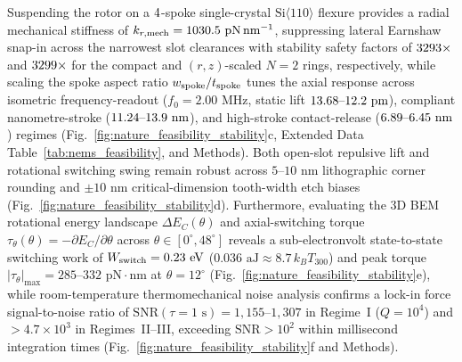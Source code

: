 \documentclass[pdflatex,sn-nature]{sn-jnl}
\DeclareRobustCommand{\roundzero}[1]{\fpeval{round(#1,0)}}
\DeclareRobustCommand{\roundone}[1]{\fpeval{round(#1,1)}}
\DeclareRobustCommand{\roundtwo}[1]{\fpeval{round(#1,2)}}
\begin{document}
Suspending the rotor on a $4{}$-spoke single-crystal $\text{Si}\langle 110\rangle$ flexure provides a radial mechanical stiffness of $k_{r,\rm mech} = \roundone{\NatureRotCeightCompactNtwoLateralStabilityKRMechPnPerNm}\text{ pN}\,\text{nm}^{-1}$, suppressing lateral Earnshaw snap-in across the narrowest slot clearances with stability safety factors of $\roundzero{\NatureRotCeightCompactNtwoLateralStabilityLateralStabilitySafetyFactor}\times$ and $\roundzero{\NatureCantorNtwoHybridrzLateralStabilityLateralStabilitySafetyFactor}\times$ for the compact and $(r,z)$-scaled $N=2$ rings, respectively, while scaling the spoke aspect ratio $w_{\rm spoke}/t_{\rm spoke}$ tunes the axial response across isometric frequency-readout ($f_0 = 2.00\text{ MHz}$, static lift $\roundtwo{\NatureCantorNtwoHybridrzLateralStabilityEquilibriumAxialRepulsiveLiftPm}\text{--}\roundtwo{\NatureRotCeightCompactNtwoLateralStabilityEquilibriumAxialRepulsiveLiftPm}\text{ pm}$), compliant nanometre-stroke ($\roundtwo{\NatureCantorNtwoHybridrzLateralStabilityNmActuatorPeakToPeakStrokeNm}\text{--}\roundtwo{\NatureRotCeightCompactNtwoLateralStabilityNmActuatorPeakToPeakStrokeNm}\text{ nm}$), and high-stroke contact-release ($\roundtwo{\NatureCantorNtwoHybridrzLateralStabilityCompactClutchBasinEqLiftNm}\text{--}\roundtwo{\NatureRotCeightCompactNtwoLateralStabilityCompactClutchBasinEqLiftNm}\text{ nm}$) regimes (Fig.~\ref{fig:nature_feasibility_stability}c, Extended Data Table~\ref{tab:nems_feasibility}, and Methods). Both open-slot repulsive lift and rotational switching swing remain robust across $5\text{--}10\text{ nm}$ lithographic corner rounding and $\pm 10\text{ nm}$ critical-dimension tooth-width etch biases (Fig.~\ref{fig:nature_feasibility_stability}d). Furthermore, evaluating the 3D BEM rotational energy landscape $\Delta E_C(\theta)$ and axial-switching torque $\tau_\theta(\theta) = -\partial E_C/\partial\theta$ across $\theta \in [0^\circ, 48^\circ]$ reveals a sub-electronvolt state-to-state switching work of $W_{\rm switch} = 0.23\text{ eV}$ ($0.036\text{ aJ} \approx 8.7\,k_B T_{300}$) and peak torque $|\tau_\theta|_{\max} = 285\text{--}332\text{ pN}\cdot\text{nm}$ at $\theta = 12^\circ$ (Fig.~\ref{fig:nature_feasibility_stability}e), while room-temperature thermomechanical noise analysis confirms a lock-in force signal-to-noise ratio of $\mathrm{SNR}(\tau = 1\text{ s}) = 1{,}155\text{--}1{,}307$ in Regime~I ($Q = 10^4$) and $>4.7 \times 10^3$ in Regimes~II--III, exceeding $\mathrm{SNR} > 10^2$ within millisecond integration times (Fig.~\ref{fig:nature_feasibility_stability}f and Methods).
\end{document}
